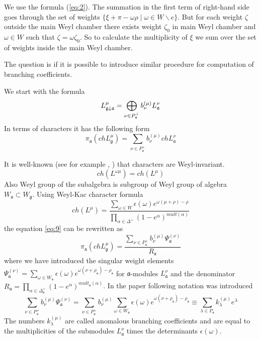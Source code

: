 \documentclass[a4paper,12pt]{article}
\theoremstyle{definition} \newtheorem{Def}{Definition}
\begin{document}
We use the formula (\ref{eq:2}). The summation in the first term of
right-hand side goes through the set of weights $\{\xi+\pi-\omega
\rho\;|\;\omega\in W\backslash e\}$.
But for each weight $\zeta$ outside the main Weyl chamber there exists
weight $\zeta_0$ in main Weyl chamber and $\omega\in W$ such that
$\zeta=\omega \zeta_0$. So to calculate the multiplicity of $\xi$ we
sum over the set of weights inside the main Weyl chamber.

The question is if it is possible to introduce similar procedure for
computation of branching coefficients. 

We start with the formula
\begin{equation}
  \label{eq:6}
  L_{\frak{g}\downarrow \frak{a}}^{\mu }=\bigoplus\limits_{\nu \in P_{\frak{a}%
    }^{+}}b_{\nu }^{\left( \mu \right) }L_{\frak{a}}^{\nu }
\end{equation}
In terms of characters it has the following form
\begin{equation}
  \label{eq:9}
  \pi_{\mathfrak{a}}(ch L^{\mu}_{\mathfrak{g}})=\sum_{\nu\in P^{+}_{\mathfrak{a}}}b^{(\mu)}_{\nu} ch L^{\nu}_{\mathfrak{a}}
\end{equation}

It is well-known (see for example \cite{wakimoto2001idl}, \cite{kac1990idl}) that characters are Weyl-invariant.
\begin{equation}
  \label{eq:8}
  ch(L^{\omega\mu})=ch(L^{\mu})
\end{equation}
Also Weyl group of the subalgebra is subgroup of Weyl group of algebra $W_{\mathfrak{a}}\subset W_{\mathfrak{g}}$.
Using Weyl-Kac character formula
\begin{equation}
  \label{eq:11}
  ch(L^{\mu})=\frac{\sum_{\omega\in W}\epsilon(\omega)e^{\omega(\mu+\rho)-\rho}}{\prod_{\alpha\in \Delta^{+}}(1-e^{\alpha})^{mult(\alpha)}}
\end{equation}
the equation \eqref{eq:9} can be rewritten as
\begin{equation}
  \label{eq:10}
  \pi_{\mathfrak{a}}(ch L^{\mu}_{\mathfrak{g}})=\frac{\sum_{\nu\in P^{+}_{\mathfrak{a}}}b^{(\mu)}_{\nu} \Psi^{(\nu)}_{\mathfrak{a}}}{R_{\mathfrak{a}}}
\end{equation}
where we have introduced the singular weight elements $\Psi^{(\nu)}_{\mathfrak{a}}=\sum_{\omega\in W_{\mathfrak{a}}}\epsilon(\omega)e^{\omega(\nu+\rho_{\mathfrak{a}})-\rho_{\mathfrak{a}}}$ for $\mathfrak{a}$-modules $L^{\nu}_{\mathfrak{a}}$ and the denominator $R_{\mathfrak{a}}=\prod_{\alpha\in \Delta^{+}_{\mathfrak{a}}}(1-e^{\alpha})^{mult_{\mathfrak{a}}(\alpha)}$. In the paper \cite{ilyin812pbc} following notation was introduced
\begin{equation}
  \label{eq:12}
  \sum_{\nu\in P^{+}_{\mathfrak{a}}}b^{(\mu)}_{\nu} \Psi^{(\nu)}_{\mathfrak{a}}
  =\sum_{\nu\in P^{+}_{\mathfrak{a}}}b^{(\mu)}_{\nu} \sum_{\omega\in W_{\mathfrak{a}}}\epsilon(\omega)e^{\omega(\nu+\rho_{\mathfrak{a}})-\rho_{\mathfrak{a}}}
  \equiv\sum_{\lambda\in P_{\mathfrak{a}}}k_{\lambda}^{(\mu)}e^{\lambda}
\end{equation}
The numbers $k_{\lambda}^{(\mu)}$ are called anomalous branching coefficients and are equal to the multiplicities of the submodules $L^{\nu}_{\mathfrak{a}}$ times the determinants $\epsilon(\omega)$.
\end{document}

